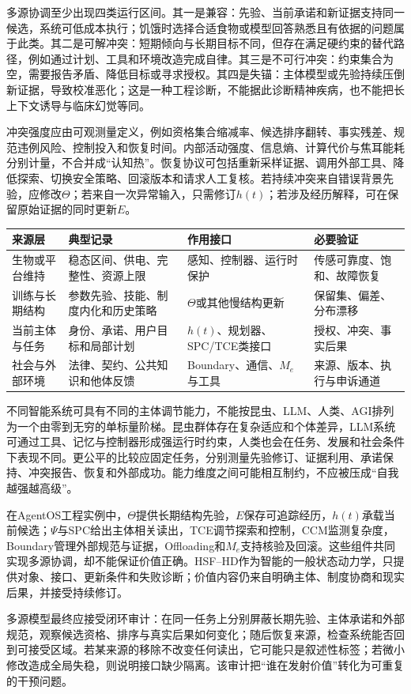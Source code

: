 多源协调至少出现四类运行区间。其一是兼容：先验、当前承诺和新证据支持同一候选，系统可低成本执行；饥饿时选择合适食物或模型回答熟悉且有依据的问题属于此类。其二是可解冲突：短期倾向与长期目标不同，但存在满足硬约束的替代路径，例如通过计划、工具和环境改造完成自律。其三是不可行冲突：约束集合为空，需要报告矛盾、降低目标或寻求授权。其四是失锚：主体模型或先验持续压倒新证据，导致校准恶化；这是一种工程诊断，不能据此诊断精神疾病，也不能把长上下文诱导与临床幻觉等同。

冲突强度应由可观测量定义，例如资格集合缩减率、候选排序翻转、事实残差、规范违例风险、控制投入和恢复时间。内部活动强度、信息熵、计算代价与焦耳能耗分别计量，不合并成“认知热”。恢复协议可包括重新采样证据、调用外部工具、降低探索、切换安全策略、回滚版本和请求人工复核。若持续冲突来自错误背景先验，应修改$\Theta$；若来自一次异常输入，只需修订$h(t)$；若涉及经历解释，可在保留原始证据的同时更新$E$。

\begin{table}[htbp]
\centering
\begin{tabularx}{\textwidth}{l X X X}
\toprule
\rowcolor{structurecolor!20} \textbf{来源层} & \textbf{典型记录} & \textbf{作用接口} & \textbf{必要验证} \\
\midrule
生物或平台维持 & 稳态区间、供电、完整性、资源上限 & 感知、控制器、运行时保护 & 传感可靠度、饱和、故障恢复 \\
训练与长期结构 & 参数先验、技能、制度内化和历史策略 & $\Theta$或其他慢结构更新 & 保留集、偏差、分布漂移 \\
当前主体与任务 & 身份、承诺、用户目标和局部计划 & $h(t)$、规划器、SPC/TCE类接口 & 授权、冲突、事实后果 \\
社会与外部环境 & 法律、契约、公共知识和他体反馈 & Boundary、通信、$M_e$与工具 & 来源、版本、执行与申诉通道 \\
\bottomrule
\end{tabularx}
\end{table}

不同智能系统可具有不同的主体调节能力，不能按昆虫、LLM、人类、AGI排列为一个由零到无穷的单标量阶梯。昆虫群体存在复杂适应和个体差异，LLM系统可通过工具、记忆与控制器形成强运行时约束，人类也会在任务、发展和社会条件下表现不同。更公平的比较应固定任务，分别测量先验修订、证据利用、承诺保持、冲突报告、恢复和外部成功。能力维度之间可能相互制约，不应被压成“自我越强越高级”。

在AgentOS工程实例中，$\Theta$提供长期结构先验，$E$保存可追踪经历，$h(t)$承载当前候选；$\Psi$与SPC给出主体相关读出，TCE调节探索和控制，CCM监测复杂度，Boundary管理外部规范与证据，Offloading和$M_e$支持核验及回滚。这些组件共同实现多源协调，却不能保证价值正确。HSF--HD作为智能的一般状态动力学，只提供对象、接口、更新条件和失败诊断；价值内容仍来自明确主体、制度协商和现实后果，并接受持续修订。

多源模型最终应接受闭环审计：在同一任务上分别屏蔽长期先验、主体承诺和外部规范，观察候选资格、排序与真实后果如何变化；随后恢复来源，检查系统能否回到可接受区域。若某来源的移除不改变任何读出，它可能只是叙述性标签；若微小修改造成全局失稳，则说明接口缺少隔离。该审计把“谁在发射价值”转化为可重复的干预问题。

